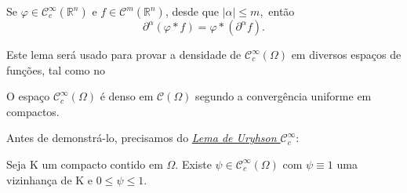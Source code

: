 \documentclass[../distribution_theory_notes.tex]{subfiles}
\begin{document}
  \begin{tcolorbox}[
  skin=enhanced,
  title=Observação,
  fonttitle=\bfseries,
colframe=black,
  colbacktitle=cyan!75!white, 
  colback=cyan!15,
  colbacklower=black,
coltitle=black,
  drop fuzzy shadow,
  ]
  Se \(\varphi \in \mathcal{C}_{c}^{\infty}(\mathbb{R}^{n})\) e \(f\in \mathcal{C}^{m}(\mathbb{R}^{n})\), desde que \(|\alpha |\leq m,\) então 
    \[
      \partial^{\alpha }(\varphi*f)=\varphi *(\partial^{\alpha }f).
    \]
  \end{tcolorbox}

  Este lema será usado para provar a densidade de \(\mathcal{C}_{c}^{\infty}(\Omega )\) em diversos espaços de funções, tal como no 
 \begin{theorem*}
   O espaço \(\mathcal{C}_{c}^{\infty}(\Omega )\) é denso em \(\mathcal{C}(\Omega )\) segundo a convergência uniforme em compactos. 
 \end{theorem*}
 Antes de demonstrá-lo, precisamos do \hyperlink{uryhson_lemma}{\textit{Lema de Uryhson \(\mathcal{C}_{c}^{\infty}\)}}: 
 \hypertarget{uryhson_lemma}{
   \begin{theorem*}
    Seja K um compacto contido em \(\Omega \). Existe \(\psi \in \mathcal{C}_{c}^{\infty}(\Omega )\) com \(\psi \equiv 1\) uma vizinhança de K e \(0\leq \psi \leq 1\).
  \end{theorem*}
 }
\end{document}
